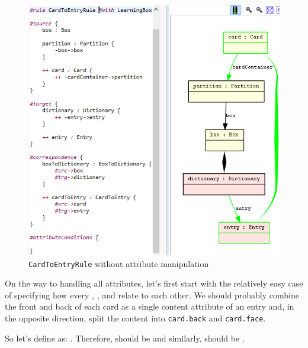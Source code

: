 \begin{figure}[htbp]
  \begin{center}
    \includegraphics[width=\textwidth]{../../org.moflon.doc.handbook.04_tripleGraphTransformations/4_rules/visRImages/ea_cardToEntryRule.PNG}
    \caption{\texttt{CardToEntryRule} without attribute manipulation}
    \label{ea:cardtoentry_1}
  \end{center}
\end{figure}

On the way to handling all attributes, let's first start with the relatively easy case of specifying how every , , and  relate to each other.
We should probably combine the front and back of each card as a single content attribute of an entry and, in the opposite direction, split the content into \texttt{card.back} and \texttt{card.face}.

So let's define  as: . 
Therefore,  should be  and similarly,  should be . 

